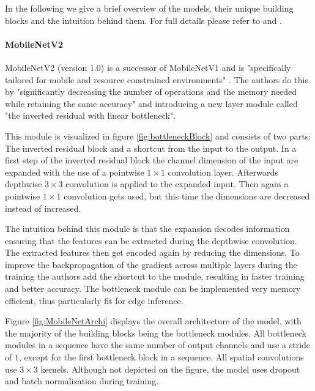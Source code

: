 In the following we give a brief overview of the models, their unique building blocks and the intuition behind them.
For full details please refer to \cite{DBLP:journals/corr/abs-1801-04381} and \cite{InceptionV4}.

\paragraph{MobileNetV2}
MobileNetV2 (version 1.0) is a successor of MobileNetV1 and is "specifically tailored for mobile and resource
constrained environments" \cite{DBLP:journals/corr/abs-1801-04381}. The authors do this by "significantly decreasing the number of operations and the memory needed while retaining the same accuracy"  \cite{DBLP:journals/corr/abs-1801-04381} and introducing a new layer module called "the
inverted residual with linear bottleneck".

This module is visualized in figure \ref{fig:bottleneckBlock} and consists of two parts: The inverted residual block and a shortcut from the input to the output.
In a first step of the inverted residual block the channel dimension of the input are expanded with the use of a pointwise $1\times1$ convolution layer. 
Afterwards depthwise $3\times3$ convolution is applied to the expanded input. Then again a pointwise $1\times1$ convolution gets used, but this time the dimensions are decreased instead of increased.

The intuition behind this module is that the expansion decodes information ensuring that the features can be extracted during the depthwise convolution. The extracted features then get encoded again by reducing the dimensions.
To improve the backpropagation of the gradient across multiple layers during the training the authors add the shortcut to the module, resulting in faster training and better accuracy.
The bottleneck module can be implemented very memory efficient, thus particularly fit for edge inference.

Figure \ref{fig:MobileNetArchi} displays the overall architecture of the model, with the majority of the building blocks being the bottleneck modules.
All bottleneck modules in a sequence have the same number of output channels and use a stride of $1$, except for the first bottleneck block in a sequence. All spatial convolutions use $3\times3$ kernels. 
Although not depicted on the figure, the model uses dropout and batch normalization during training.

